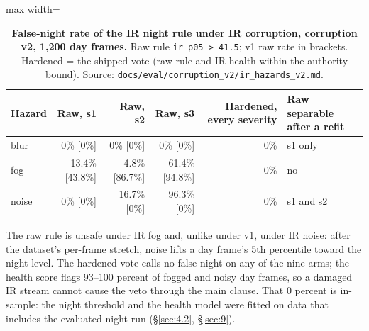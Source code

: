 \documentclass[10pt]{article}
\begin{document}
\begin{table}[htbp]
\centering
\footnotesize
\caption{\textbf{False-night rate of the IR night rule under IR corruption, corruption v2, 1,200 day frames.} Raw rule \texttt{ir\_\allowbreak{}p05 > 41.5}; v1 raw rate in brackets. Hardened = the shipped vote (raw rule and IR health within the authority bound). Source: \texttt{docs/\allowbreak{}eval/\allowbreak{}corruption\_\allowbreak{}v2/\allowbreak{}ir\_\allowbreak{}hazards\_\allowbreak{}v2.md}.}
\label{tab:6}
\begin{adjustbox}{max width=\linewidth}
\begin{tabular}{lrrrrl}
\toprule
Hazard & Raw, s1 & Raw, s2 & Raw, s3 & Hardened, every severity & Raw separable after a refit \\
\midrule
blur & 0\% [0\%] & 0\% [0\%] & 0\% [0\%] & 0\% & s1 only \\
fog & 13.4\% [43.8\%] & 4.8\% [86.7\%] & 61.4\% [94.8\%] & 0\% & no \\
noise & 0\% [0\%] & 16.7\% [0\%] & 96.3\% [0\%] & 0\% & s1 and s2 \\
\bottomrule
\end{tabular}
\end{adjustbox}
\end{table}
The raw rule is unsafe under IR fog and, unlike under v1, under IR noise: after the dataset's per-frame stretch, noise lifts a day frame's 5th percentile toward the night level. The hardened vote calls no false night on any of the nine arms; the health score flags 93--100 percent of fogged and noisy day frames, so a damaged IR stream cannot cause the veto through the main clause. That 0 percent is in-sample: the night threshold and the health model were fitted on data that includes the evaluated night run (\S\ref{sec:4.2}, \S\ref{sec:9}).
\end{document}
